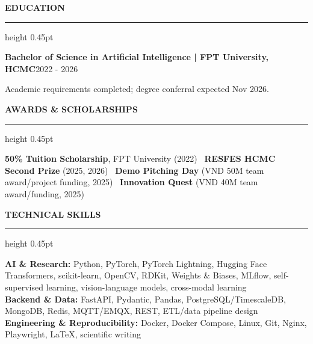 \documentclass[10pt]{article}
\newcommand{\cvsection}[1]{%
    \vspace{6.2pt}%
    {\color{accent}\bfseries\small #1}\par
    \vspace{2.3pt}%
    {\color{rulegray}\hrule height 0.45pt}\vspace{4.0pt}%
}
\newcommand{\entry}[2]{%
    \textbf{#1}\hfill {\color{muted}\small #2}\par
}
\begin{document}
\cvsection{EDUCATION}
\entry{Bachelor of Science in Artificial Intelligence | FPT University, HCMC}{2022 - 2026}
{\small Academic requirements completed; degree conferral expected Nov 2026.}

\cvsection{AWARDS \& SCHOLARSHIPS}
{\small \textbf{50\% Tuition Scholarship}, FPT University (2022) \textbullet\
\textbf{RESFES HCMC Second Prize} (2025, 2026) \textbullet\
\textbf{Demo Pitching Day} (VND 50M team award/project funding, 2025) \textbullet\
\textbf{Innovation Quest} (VND 40M team award/funding, 2025)}

\cvsection{TECHNICAL SKILLS}
{\footnotesize
\textbf{AI \& Research:} Python, PyTorch, PyTorch Lightning, Hugging Face Transformers, scikit-learn, OpenCV, RDKit, Weights \& Biases, MLflow, self-supervised learning, vision-language models, cross-modal learning\\
\textbf{Backend \& Data:} FastAPI, Pydantic, Pandas, PostgreSQL/TimescaleDB, MongoDB, Redis, MQTT/EMQX, REST, ETL/data pipeline design\\
\textbf{Engineering \& Reproducibility:} Docker, Docker Compose, Linux, Git, Nginx, Playwright, LaTeX, scientific writing
}
\end{document}
